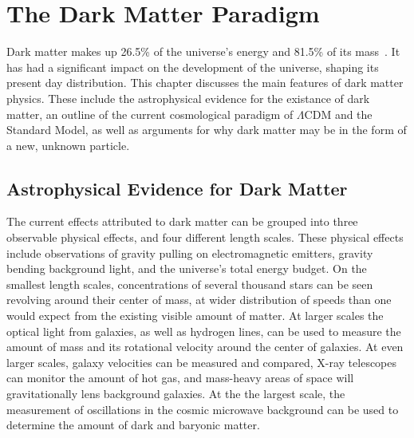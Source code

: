 \cleartooddpage[\thispagestyle{empty}]
\newcommand{\thetamc}{\theta_{\textrm{MC}}}
\chapter{The Dark Matter Paradigm}\label{ch_dm}

  Dark matter makes up 26.5\% of the universe's energy and 81.5\% of its mass~\cite{planck2015}.
  It has had a significant impact on the development of the universe, shaping its present day distribution.
  This chapter discusses the main features of dark matter physics.
  These include the astrophysical evidence for the existance of dark matter, an outline of the current cosmological paradigm of $\Lambda$CDM and the Standard Model, as well as arguments for why dark matter may be in the form of a new, unknown particle.


\section{Astrophysical Evidence for Dark Matter}
  
  The current effects attributed to dark matter can be grouped into three observable physical effects, and four different length scales.
  These physical effects include observations of gravity pulling on electromagnetic emitters, gravity bending background light, and the universe's total energy budget.
  On the smallest length scales, concentrations of several thousand stars can be seen revolving around their center of mass, at wider distribution of speeds than one would expect from the existing visible amount of matter.
  At larger scales the optical light from galaxies, as well as hydrogen lines, can be used to measure the amount of mass and its rotational velocity around the center of galaxies.
  At even larger scales, galaxy velocities can be measured and compared, X-ray telescopes can monitor the amount of hot gas, and mass-heavy areas of space will gravitationally lens background galaxies.
  At the the largest scale, the measurement of oscillations in the cosmic microwave background can be used to determine the amount of dark and baryonic matter.
  
